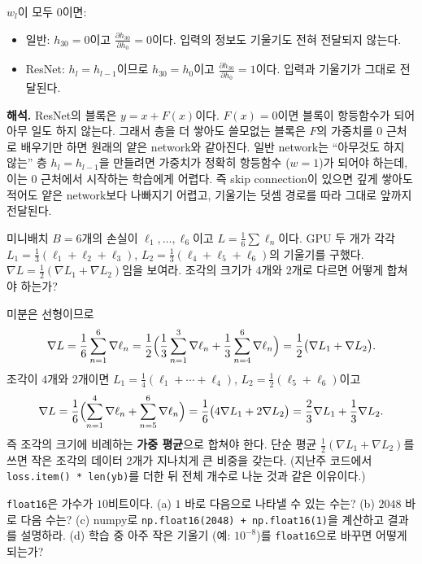 \documentclass[11pt,a4paper]{article}
\newcommand{\grad}{\nabla}
\newcommand{\pd}[2]{\frac{\partial #1}{\partial #2}}
\begin{document}
\begin{problems}
\begin{sol}
$w_l$이 모두 $0$이면:
\begin{itemize}[leftmargin=1.5em,itemsep=2pt]
\item 일반: $h_{30}=0$이고 $\pd{h_{30}}{h_0}=0$이다. 입력의 정보도 기울기도 전혀 전달되지 않는다.
\item ResNet: $h_l=h_{l-1}$이므로 $h_{30}=h_0$이고 $\pd{h_{30}}{h_0}=1$이다. 입력과 기울기가 그대로 전달된다.
\end{itemize}

\textbf{해석.} ResNet의 블록은 $y=x+F(x)$이다. $F(x)=0$이면 블록이 항등함수가 되어 아무 일도 하지 않는다.
그래서 층을 더 쌓아도 쓸모없는 블록은 $F$의 가중치를 $0$ 근처로 배우기만 하면 원래의 얕은 network와 같아진다.
일반 network는 ``아무것도 하지 않는'' 층 $h_l=h_{l-1}$을 만들려면 가중치가 정확히 항등함수 ($w=1$)가 되어야 하는데, 이는 $0$ 근처에서 시작하는 학습에게 어렵다.
즉 skip connection이 있으면 깊게 쌓아도 적어도 얕은 network보다 나빠지기 어렵고, 기울기는 덧셈 경로를 따라 그대로 앞까지 전달된다.
\end{sol}

\item 미니배치 $B=6$개의 손실이 $\ell_1,\ldots,\ell_6$이고 $L=\frac16\sum\ell_n$이다.
GPU 두 개가 각각 $L_1=\frac13(\ell_1+\ell_2+\ell_3)$, $L_2=\frac13(\ell_4+\ell_5+\ell_6)$의 기울기를 구했다.
$\grad L=\frac12(\grad L_1+\grad L_2)$임을 보여라. 조각의 크기가 $4$개와 $2$개로 다르면 어떻게 합쳐야 하는가?

\begin{sol}
미분은 선형이므로
\[
\grad L=\frac16\sum_{n=1}^{6}\grad\ell_n
=\frac12\Bigl(\frac13\sum_{n=1}^{3}\grad\ell_n+\frac13\sum_{n=4}^{6}\grad\ell_n\Bigr)
=\frac12\bigl(\grad L_1+\grad L_2\bigr).
\]
조각이 $4$개와 $2$개이면 $L_1=\frac14(\ell_1+\cdots+\ell_4)$, $L_2=\frac12(\ell_5+\ell_6)$이고
\[
\grad L=\frac16\Bigl(\sum_{n=1}^{4}\grad\ell_n+\sum_{n=5}^{6}\grad\ell_n\Bigr)
=\frac16\bigl(4\grad L_1+2\grad L_2\bigr)=\frac23\grad L_1+\frac13\grad L_2 .
\]
즉 조각의 크기에 비례하는 \textbf{가중 평균}으로 합쳐야 한다. 단순 평균 $\frac12(\grad L_1+\grad L_2)$를 쓰면 작은 조각의 데이터 $2$개가 지나치게 큰 비중을 갖는다.
(지난주 코드에서 \texttt{loss.item() * len(yb)}를 더한 뒤 전체 개수로 나눈 것과 같은 이유이다.)
\end{sol}

\item \texttt{float16}은 가수가 $10$비트이다. (a) $1$ 바로 다음으로 나타낼 수 있는 수는? (b) $2048$ 바로 다음 수는?
(c) numpy로 \texttt{np.float16(2048) + np.float16(1)}을 계산하고 결과를 설명하라.
(d) 학습 중 아주 작은 기울기 (예: $10^{-8}$)를 \texttt{float16}으로 바꾸면 어떻게 되는가?


\end{problems}
\end{document}
